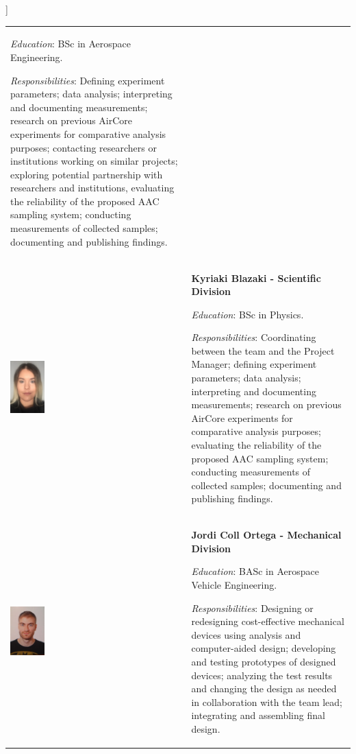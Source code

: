 ]\documentclass[a4paper,12pt,twoside]{article}
\begin{document}
\begin{longtable}[]{m{} m{}}
\smallskip
\textit{Education}: BSc in Aerospace Engineering.

\smallskip
\textit{Responsibilities}: Defining experiment parameters; data analysis; interpreting and documenting measurements; research on previous AirCore experiments for comparative analysis purposes; contacting researchers or institutions working on similar projects; exploring potential partnership with researchers and institutions, evaluating the reliability of the proposed AAC sampling system; conducting measurements of collected samples; documenting and publishing findings. 
\bigskip
\\

\includegraphics[width=0.2\textwidth]{1-introduction/img/kiki-blazaki.jpg} & \textbf{Kyriaki Blazaki - Scientific Division}

\smallskip
\textit{Education}: BSc in Physics.


\smallskip
\textit{Responsibilities}: Coordinating between the team and the Project Manager; defining experiment parameters; data analysis; interpreting and documenting measurements; research on previous AirCore experiments for comparative analysis purposes; evaluating the reliability of the proposed AAC sampling system; conducting measurements of collected samples; documenting and publishing findings. 
\bigskip
\\

\includegraphics[width=0.2\textwidth]{1-introduction/img/jordi-coll-ortega.jpg} & \textbf{Jordi Coll Ortega - Mechanical Division}

\smallskip
\textit{Education}: BASc in Aerospace Vehicle Engineering.

\smallskip
\textit{Responsibilities}: Designing or redesigning cost-effective mechanical devices using analysis and computer-aided design; developing and testing prototypes of designed devices; analyzing the test results and changing the design as needed in collaboration with the team lead; integrating and assembling final design.
\bigskip
\\


\end{longtable}
\end{document}
